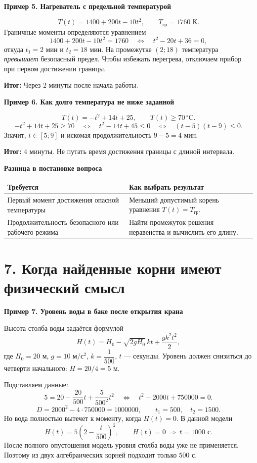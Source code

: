 \documentclass[a4paper,12pt]{article}
\newcommand{\idea}[1]{\textcolor{darkaccent}{\textbf{#1}}}
\newcommand{\result}[1]{\textcolor{darkaccent}{\textbf{Итог:}} #1}
\newcommand{\ex}[2]{\vspace{4pt}\noindent\textcolor{darkaccent}{\textbf{Пример #1. #2}}\par\nopagebreak[3]}
\newcommand{\sectionline}{\par\vspace{-1mm}{\color{accent}\hrule height .45pt}\vspace{4mm}}
\newcommand{\sect}[2]{\section*{\textcolor{darkaccent}{#1. #2}}\sectionline}
\begin{document}
\ex{5}{Нагреватель с предельной температурой}
\[
 T(t)=1400+200t-10t^2,\qquad T_{\text{гр}}=1760\text{ К}.
\]
Граничные моменты определяются уравнением
\[
 1400+200t-10t^2=1760
 \quad\Longleftrightarrow\quad t^2-20t+36=0,
\]
откуда $t_1=2$ мин и $t_2=18$ мин. На промежутке $(2;18)$ температура \emph{превышает} безопасный предел. Чтобы избежать перегрева, отключаем прибор при первом достижении границы.

\result{Через $2$ минуты после начала работы.}

\ex{6}{Как долго температура не ниже заданной}
\[
 T(t)=-t^2+14t+25,\qquad T(t)\ge70\,^{\circ}\mathrm{C}.
\]
\[
 -t^2+14t+25\ge70
 \quad\Longleftrightarrow\quad t^2-14t+45\le0
 \quad\Longleftrightarrow\quad (t-5)(t-9)\le0.
\]
Значит, $t\in[5;9]$ и искомая продолжительность $9-5=4$ мин.

\result{$4$ минуты. Не путать время достижения границы с длиной интервала.}

\vspace{5mm}
\idea{Разница в постановке вопроса}\par
\begin{tabularx}{\linewidth}{@{}p{.37\linewidth}X@{}}
\toprule
\textcolor{darkaccent}{Требуется} & \textcolor{darkaccent}{Как выбрать результат}\\
\midrule
Первый момент достижения опасной температуры & Меньший допустимый корень уравнения $T(t)=T_{\text{гр}}$.\\
Продолжительность безопасного или рабочего режима & Найти промежуток решения неравенства и вычислить его длину.\\
\bottomrule
\end{tabularx}

\clearpage
\sect{7}{Когда найденные корни имеют физический смысл}
\ex{7}{Уровень воды в баке после открытия крана}
Высота столба воды задаётся формулой
\[
 H(t)=H_0-\sqrt{2gH_0}\,kt+\frac{gk^2t^2}{2},
\]
где $H_0=20$ м, $g=10$ м/с$^2$, $k=\dfrac1{500}$, $t$ --- секунды. Уровень должен снизиться до четверти начального: $H=20/4=5$ м.

Подставляем данные:
\[
 5=20-\frac{20}{500}t+\frac{5}{500^2}t^2
 \quad\Longleftrightarrow\quad t^2-2000t+750000=0.
\]
\[
 D=2000^2-4\cdot750000=1000000,
 \qquad t_1=500,\quad t_2=1500.
\]
Но вода полностью вытечет к моменту, когда $H(t)=0$. В данной модели
\[
 H(t)=5\left(2-\frac{t}{500}\right)^2,
 \qquad H(t)=0\ \Longrightarrow\ t=1000\text{ с}.
\]
После полного опустошения модель уровня столба воды уже не применяется. Поэтому из двух алгебраических корней подходит только $500$ с.
\end{document}
